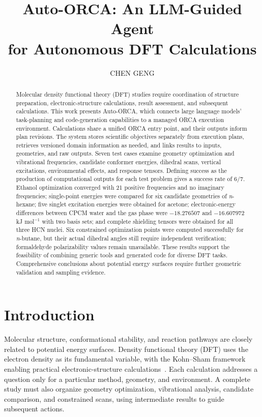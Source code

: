 \documentclass[a4paper,11pt]{article}
\title{\vspace{-1.0cm}\LARGE\bfseries
 Auto-ORCA: An LLM-Guided Agent\\[0.2em]
 for Autonomous DFT Calculations}
\author{\large CHEN GENG}
\date{}
\begin{document}
\maketitle
\vspace{-0.7cm}
\begin{abstract}
  Molecular density functional theory (DFT) studies require coordination of structure preparation, electronic-structure calculations, result assessment, and subsequent calculations.
  This work presents Auto-ORCA, which connects large language models' task-planning and code-generation capabilities to a managed ORCA execution environment.
  Calculations share a unified ORCA entry point, and their outputs inform plan revisions.
  The system stores scientific objectives separately from execution plans, retrieves versioned domain information as needed, and links results to inputs, geometries, and raw outputs.
  Seven test cases examine geometry optimization and vibrational frequencies, candidate conformer energies, dihedral scans, vertical excitations, environmental effects, and response tensors.
  Defining success as the production of computational outputs for each test problem gives a success rate of $6/7$.
  Ethanol optimization converged with 21 positive frequencies and no imaginary frequencies; single-point energies were compared for six candidate geometries of \textit{n}-hexane; five singlet excitation energies were obtained for acetone; electronic-energy differences between CPCM water and the gas phase were $-18.276507$ and $-16.607972$ kJ mol$^{-1}$ with two basis sets; and complete shielding tensors were obtained for all three HCN nuclei.
  Six constrained optimization points were computed successfully for \textit{n}-butane, but their actual dihedral angles still require independent verification; formaldehyde polarizability values remain unavailable.
  These results support the feasibility of combining generic tools and generated code for diverse DFT tasks.
  Comprehensive conclusions about potential energy surfaces require further geometric validation and sampling evidence.
\end{abstract}

\section{Introduction}
Molecular structure, conformational stability, and reaction pathways are closely related to potential energy surfaces.
Density functional theory (DFT) uses the electron density as its fundamental variable, with the Kohn--Sham framework enabling practical electronic-structure calculations~\cite{hk,ks}.
Each calculation addresses a question only for a particular method, geometry, and environment.
A complete study must also organize geometry optimization, vibrational analysis, candidate comparison, and constrained scans, using intermediate results to guide subsequent actions.
\end{document}
